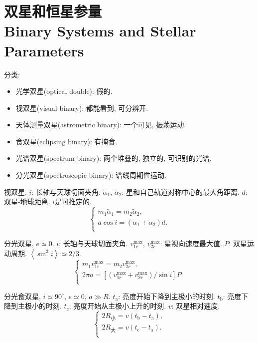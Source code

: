 \chapter{双星和恒星参量\\Binary Systems and Stellar Parameters}

分类:
\begin{itemize}
    \item 光学双星(optical double): 假的.
    \item 视双星(visual binary): 都能看到, 可分辨开.
    \item 天体测量双星(astrometric binary): 一个可见, 振荡运动.
    \item 食双星(eclipsing binary): 有掩食.
    \item 光谱双星(spectrum binary): 两个堆叠的, 独立的, 可识别的光谱.
    \item 分光双星(spectroscopic binary): 谱线周期性运动.
\end{itemize}

视双星. $i$: 长轴与天球切面夹角. $\tilde{\alpha}_1$, $\tilde{\alpha}_2$: 星和自己轨道对称中心的最大角距离. $d$: 双星-地球距离. $i$是可推定的.
\begin{equation*}
    \begin{cases}
        m_1 \tilde{\alpha}_1 = m_2 \tilde{\alpha}_2, \\
        a \cos i = (\tilde{\alpha}_1+\tilde{\alpha}_2) d. \\
    \end{cases}
\end{equation*}

分光双星, $e\simeq0$. $i$: 长轴与天球切面夹角. $v_{1r}^\text{max}$, $v_{2r}^\text{max}$: 星视向速度最大值. $P$: 双星运动周期. $\left\langle \sin^3 i\right\rangle \simeq 2/3$.
\begin{equation*}
    \begin{cases}
        m_1 v_{1r}^\text{max} = m_2 v_{2r}^\text{max}, \\
        2 \pi a = [(v_{1r}^\text{max}+v_{2r}^\text{max}) / \sin i] P. \\
    \end{cases}
\end{equation*}

分光食双星, $i\simeq90^{\circ}$, $e\simeq0$, $a\gg R$. $t_\text{a}$: 亮度开始下降到主极小的时刻. $t_\text{b}$: 亮度下降到主极小的时刻. $t_\text{c}$: 亮度开始从主极小上升的时刻. $v$: 双星相对速度.
\begin{equation*}
    \begin{cases}
        2 R_\text{小} = v (t_\text{b}-t_\text{a}), \\
        2 R_\text{大} = v (t_\text{c}-t_\text{a}). \\
    \end{cases}
\end{equation*}

